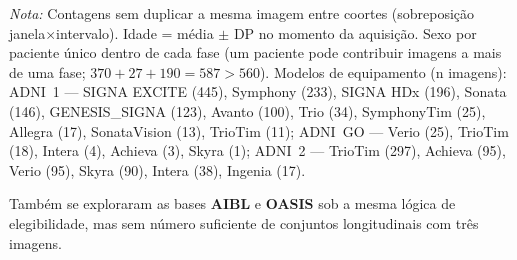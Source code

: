 \documentclass[review]{elsarticle}
\begin{document}
	\begin{table}[htbp]
		\centering
		\footnotesize
		\caption{Imagens T1w MP-RAGE por fase ADNI (união das quatro coortes de análise; imagens únicas por identificador de aquisição).}
		\label{tab:adni_study}
		\begin{flushleft}
			\footnotesize
			\textit{Nota:} Contagens sem duplicar a mesma imagem entre coortes (sobreposição janela$\times$intervalo).
			Idade = média $\pm$ DP no momento da aquisição.
			Sexo por paciente único dentro de cada fase (um paciente pode contribuir imagens a mais de uma fase; $370+27+190=587>560$).
			Modelos de equipamento (n imagens):
			ADNI~1 --- SIGNA EXCITE (445), Symphony (233), SIGNA HDx (196), Sonata (146), GENESIS\_SIGNA (123), Avanto (100), Trio (34), SymphonyTim (25), Allegra (17), SonataVision (13), TrioTim (11);
			ADNI~GO --- Verio (25), TrioTim (18), Intera (4), Achieva (3), Skyra (1);
			ADNI~2 --- TrioTim (297), Achieva (95), Verio (95), Skyra (90), Intera (38), Ingenia (17).
		\end{flushleft}
	\end{table}
	
	Também se exploraram as bases \textbf{AIBL} e \textbf{OASIS} sob a mesma lógica de elegibilidade, mas sem número suficiente de conjuntos longitudinais com três imagens.
	
\end{document}
